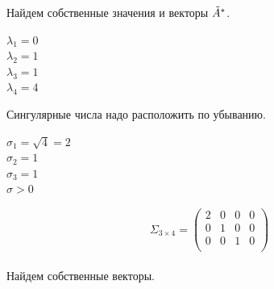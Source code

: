 \documentclass[12pt]{article}
\theoremstyle{definition}
\numberwithin{equation}{section}
\begin{document}
	Найдем собственные значения и векторы $\tilde{A}^*\title{A}$.
	\begin{center}
		$\lambda_1=0$\\
		$\lambda_2=1$\\
		$\lambda_3=1$\\
		$\lambda_4=4$\\
	\end{center}
	Сингулярные числа надо расположить по убыванию.
	\begin{center}
		$\sigma_1=\sqrt{4}=2$\\
		$\sigma_2=1$\\
		$\sigma_3=1$\\
		$\sigma>0$\\
	\end{center}
	\[\Sigma_{3 \times 4} = \begin{pmatrix}
	2 & 0 & 0 & 0\\         
	0 & 1 & 0 & 0\\
	0 & 0 & 1 & 0\\
	\end{pmatrix}\]
	\\
	Найдем собственные векторы.
\end{document}
